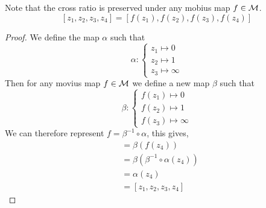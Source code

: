 \documentclass{article}
\begin{document}
\begin{remark}
    Note that the cross ratio is preserved under any mobius map $f \in \mathcal{M}$.
    \[
        [z_1, z_2, z_3, z_4] = [f(z_1), f(z_2), f(z_3), f(z_4)]  
    \]
\end{remark}
\begin{proof}
    We define the map $\alpha$ such that
    \[
        \alpha: \begin{cases}
            z_1 \mapsto 0 \\
            z_2 \mapsto 1 \\
            z_3 \mapsto \infty
        \end{cases}  
    \]
    Then for any movius map $f \in \mathcal{M}$ we define a new map $\beta$ such that
    \[
        \beta: \begin{cases}
            f(z_1) \mapsto 0 \\
            f(z_2) \mapsto 1 \\
            f(z_3) \mapsto \infty
        \end{cases}  
    \]
    We can therefore represent $f = \beta^{-1} \circ \alpha$, this gives,
    \begin{align*}
        [f(z_1), f(z_2), f(z_3), f(z_4)] &= \beta(f(z_4)) \\
        &= \beta(\beta^{-1} \circ \alpha (z_4)) \\
        &= \alpha(z_4) \\
        &= [z_1, z_2, z_3, z_4]
    \end{align*}
\end{proof}
\end{document}
